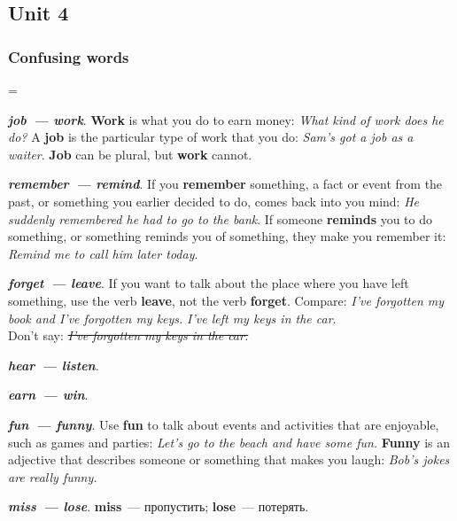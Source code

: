 \documentclass[10pt,a4paper]{article}
\newlength{\OriginalParIndent}
\newcommand\ex[1]{\textit{\textbf{{#1}}}}           %
\begin{document}
\subsection{Unit 4}
\subsubsection{Confusing words}

\begingroup
\parindent=\OriginalParIndent

\ex{job~--- work}. \textbf{Work} is what you do to earn money: \textit{What kind of work does he do?}
A \textbf{job} is the particular type of work that you do: \textit{Sam's got a job as a waiter}.
\textbf{Job} can be plural, but \textbf{work} cannot.

\ex{remember~--- remind}. If you \textbf{remember} something, a fact or event from the past,
or something you earlier decided to do, comes back into you mind:
\textit{He suddenly remembered he had to go to the bank}. If someone \textbf{reminds} you to
do something, or something reminds you of something, they make you remember it:
\textit{Remind me to call him later today}.


\ex{forget~--- leave}. If you want to talk about the place where you have left something, use the
verb \textbf{leave}, not the verb \textbf{forget}. Compare: \textit{I've forgotten my book and I've
forgotten my keys.} \textit{I've left my keys in the car}.\\
Don't say: \textit{\sout{I've forgotten my keys in the car.}}

\ex{hear~--- listen}.

\ex{earn~--- win}.

\ex{fun~--- funny}. Use \textbf{fun} to talk about events and activities that are enjoyable, such as
games and parties: \textit{Let's go to the beach and have some fun.} \textbf{Funny} is an adjective
that describes someone or something that makes you laugh: \textit{Bob's jokes are really funny.}

\ex{miss~--- lose}. \textbf{miss}~--- пропустить; \textbf{lose}~--- потерять.

\endgroup
\end{document}
